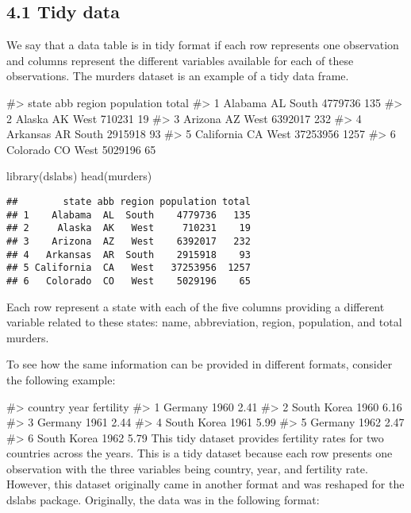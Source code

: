 \documentclass[
]{article}
\newenvironment{Shaded}{\begin{snugshade}}{\end{snugshade}}
\newcommand{\FunctionTok}[1]{\textcolor[rgb]{0.00,0.00,0.00}{#1}}
\newcommand{\NormalTok}[1]{#1}
\begin{document}
\hypertarget{tidy-data}{%
\subsection{4.1 Tidy data}\label{tidy-data}}

We say that a data table is in tidy format if each row represents one
observation and columns represent the different variables available for
each of these observations. The murders dataset is an example of a tidy
data frame.

\#\textgreater{} state abb region population total \#\textgreater{} 1
Alabama AL South 4779736 135 \#\textgreater{} 2 Alaska AK West 710231 19
\#\textgreater{} 3 Arizona AZ West 6392017 232 \#\textgreater{} 4
Arkansas AR South 2915918 93 \#\textgreater{} 5 California CA West
37253956 1257 \#\textgreater{} 6 Colorado CO West 5029196 65

\begin{Shaded}
\begin{Highlighting}[]
\FunctionTok{library}\NormalTok{(dslabs)}
\FunctionTok{head}\NormalTok{(murders)}
\end{Highlighting}
\end{Shaded}

\begin{verbatim}
##        state abb region population total
## 1    Alabama  AL  South    4779736   135
## 2     Alaska  AK   West     710231    19
## 3    Arizona  AZ   West    6392017   232
## 4   Arkansas  AR  South    2915918    93
## 5 California  CA   West   37253956  1257
## 6   Colorado  CO   West    5029196    65
\end{verbatim}

Each row represent a state with each of the five columns providing a
different variable related to these states: name, abbreviation, region,
population, and total murders.

To see how the same information can be provided in different formats,
consider the following example:

\#\textgreater{} country year fertility \#\textgreater{} 1 Germany 1960
2.41 \#\textgreater{} 2 South Korea 1960 6.16 \#\textgreater{} 3 Germany
1961 2.44 \#\textgreater{} 4 South Korea 1961 5.99 \#\textgreater{} 5
Germany 1962 2.47 \#\textgreater{} 6 South Korea 1962 5.79 This tidy
dataset provides fertility rates for two countries across the years.
This is a tidy dataset because each row presents one observation with
the three variables being country, year, and fertility rate. However,
this dataset originally came in another format and was reshaped for the
dslabs package. Originally, the data was in the following format:
\end{document}
